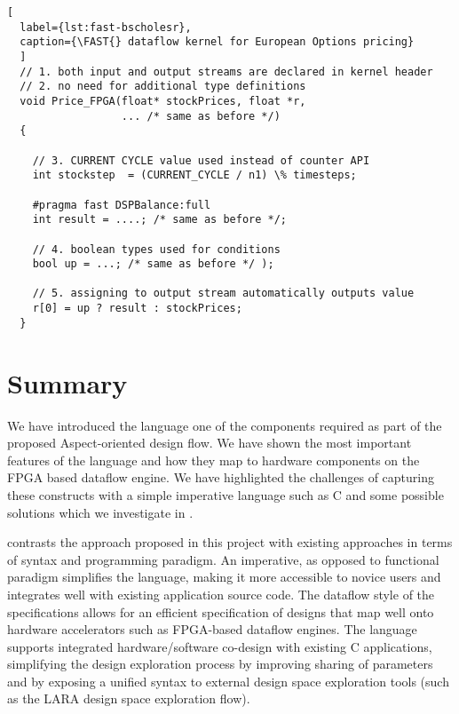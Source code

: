 \lstset{style=MaxC}

\begin{lstlisting}[
  label={lst:fast-bscholesr},
  caption={\FAST{} dataflow kernel for European Options pricing}
  ]
  // 1. both input and output streams are declared in kernel header
  // 2. no need for additional type definitions
  void Price_FPGA(float* stockPrices, float *r,
                  ... /* same as before */)
  {

    // 3. CURRENT CYCLE value used instead of counter API
    int stockstep  = (CURRENT_CYCLE / n1) \% timesteps;

    #pragma fast DSPBalance:full
    int result = ....; /* same as before */;

    // 4. boolean types used for conditions
    bool up = ...; /* same as before */ );

    // 5. assigning to output stream automatically outputs value
    r[0] = up ? result : stockPrices;
  }

\end{lstlisting}


\section{Summary}

We have introduced the \FAST{} language one of the components required
as part of the proposed Aspect-oriented design flow. We have shown the
most important features of the \FAST{} language and how they map to
hardware components on the FPGA based dataflow engine. We have
highlighted the challenges of capturing these constructs with a simple
imperative language such as C and some possible solutions which we
investigate in  .

 contrasts the \FAST{} approach
proposed in this project with existing approaches in terms of syntax
and programming paradigm. An imperative, as opposed to functional
paradigm simplifies the language, making it more accessible to novice
users and integrates well with existing application source code. The
dataflow style of the \FAST{} specifications allows for an efficient
specification of designs that map well onto hardware accelerators such
as FPGA-based dataflow engines. The language supports integrated
hardware/software co-design with existing C applications, simplifying
the design exploration process by improving sharing of parameters and
by exposing a unified syntax to external design space exploration
tools (such as the LARA design space exploration flow).

